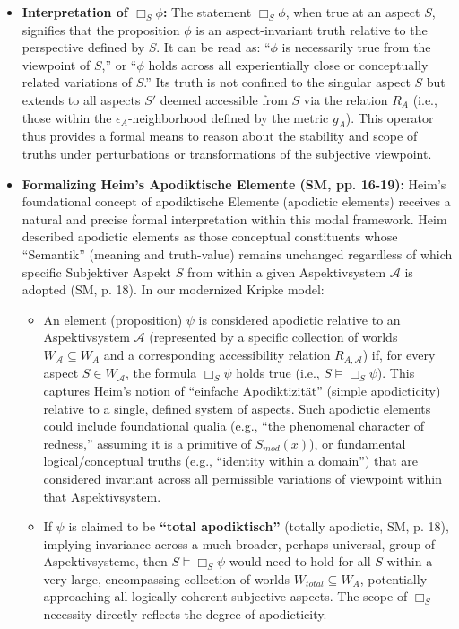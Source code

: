 \documentclass[
    12pt,              %
    a4paper,           %
    headings=normal,   %
    twoside=true,      %
    BCOR=8mm,          %
]{scrbook}
\newcommand{\q}[1]{\enquote{#1}}
\newcommand{\Smodx}{S_{mod}(x)}
\newcommand{\BoxS}{\Box_S}
\begin{document}
\begin{itemize}
    \item   \textbf{Interpretation of \(\BoxS \phi\):} The statement \(\BoxS \phi\), when true at an aspect \(S\), signifies that the proposition \(\phi\) is an aspect-invariant truth relative to the perspective defined by \(S\). It can be read as: \q{\(\phi\) is necessarily true from the viewpoint of \(S\),} or \q{\(\phi\) holds across all experientially close or conceptually related variations of \(S\).} Its truth is not confined to the singular aspect \(S\) but extends to all aspects \(S'\) deemed accessible from \(S\) via the relation \(R_A\) (i.e., those within the \(\epsilon_A\)-neighborhood defined by the metric \(g_A\)). This operator thus provides a formal means to reason about the stability and scope of truths under perturbations or transformations of the subjective viewpoint.

    \item   \textbf{Formalizing Heim's Apodiktische Elemente (SM, pp. 16-19):}
        Heim's foundational concept of apodiktische Elemente (apodictic elements) receives a natural and precise formal interpretation within this modal framework. Heim described apodictic elements as those conceptual constituents whose \q{Semantik} (meaning and truth-value) remains unchanged regardless of which specific Subjektiver Aspekt \(S\) from within a given Aspektivsystem \(\mathcal{A}\) is adopted (SM, p. 18). In our modernized Kripke model:
        \begin{itemize}
            \item   An element (proposition) \(\psi\) is considered apodictic relative to an Aspektivsystem \(\mathcal{A}\) (represented by a specific collection of worlds \(W_\mathcal{A} \subseteq W_A\) and a corresponding accessibility relation \(R_{A,\mathcal{A}}\)) if, for every aspect \(S \in W_\mathcal{A}\), the formula \(\BoxS \psi\) holds true (i.e., \(S \vDash \BoxS \psi\)). This captures Heim's notion of \q{einfache Apodiktizität} (simple apodicticity) relative to a single, defined system of aspects. Such apodictic elements could include foundational qualia (e.g., \q{the phenomenal character of redness,} assuming it is a primitive of \(\Smodx\)), or fundamental logical/conceptual truths (e.g., \q{identity within a domain}) that are considered invariant across all permissible variations of viewpoint within that Aspektivsystem.

            \item   If \(\psi\) is claimed to be \textbf{\q{total apodiktisch}} (totally apodictic, SM, p. 18), implying invariance across a much broader, perhaps universal, group of Aspektivsysteme, then \(S \vDash \BoxS \psi\) would need to hold for all \(S\) within a very large, encompassing collection of worlds \(W_{total} \subseteq W_A\), potentially approaching all logically coherent subjective aspects. The scope of \(\BoxS\)-necessity directly reflects the degree of apodicticity.
        \end{itemize}


\end{itemize}
\end{document}
